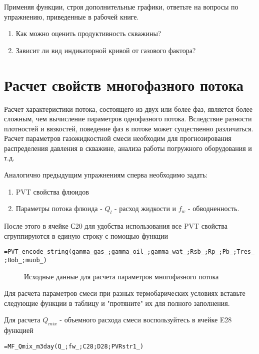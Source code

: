 Применяя функции, строя дополнительные графики, ответьте на вопросы по упражнению, приведенные в рабочей книге.

	\begin{enumerate}
		\item Как можно оценить продуктивность скважины?
		\item Зависит ли вид индикаторной кривой от газового фактора?
	\end{enumerate}



\section{Расчет свойств многофазного потока}

Расчет характеристики потока, состоящего из двух или более фаз, является более сложным, чем вычисление параметров однофазного потока. Вследствие разности плотностей и вязкостей, поведение фаз в потоке может существенно различаться. Расчет параметров газожидкостной смеси необходим для прогнозирования распределения давления в скважине, анализа работы погружного оборудования и т.д.
 
Аналогично предыдущим упражнениям сперва необходимо задать:
	\begin{enumerate}
		\item PVT свойства флюидов
		\item Параметры потока флюида - $Q_{l}$ - расход жидкости и $f_{w}$ - обводненность.
	\end{enumerate}
После этого в ячейке С20 для удобства использования все PVT свойства сгруппируются в единую строку с помощью функции

{ \small  \texttt{=PVT\_encode\_string(gamma\_gas\_;gamma\_oil\_;gamma\_wat\_;Rsb\_;Rp\_;Pb\_;Tres\_;Bob\_;muob\_)}}

\begin{figure}[h!]
	\center{\texttt{[image: Ex30\_1]}}
	\caption{Исходные данные для расчета параметров многофазного потока}
	\label{ris:Ex30_1}
\end{figure}

Для расчета параметров смеси при разных термобарических условиях вставьте следующие функции в таблицу и "протяните" их для полного заполнения.

Для расчета $Q_{mix}$ - объемного расхода смеси воспользуйтесь в ячейке E28 функцией

{ \small  \texttt{=MF\_Qmix\_m3day(Q\_;fw\_;C28;D28;PVRstr1\_)}}


